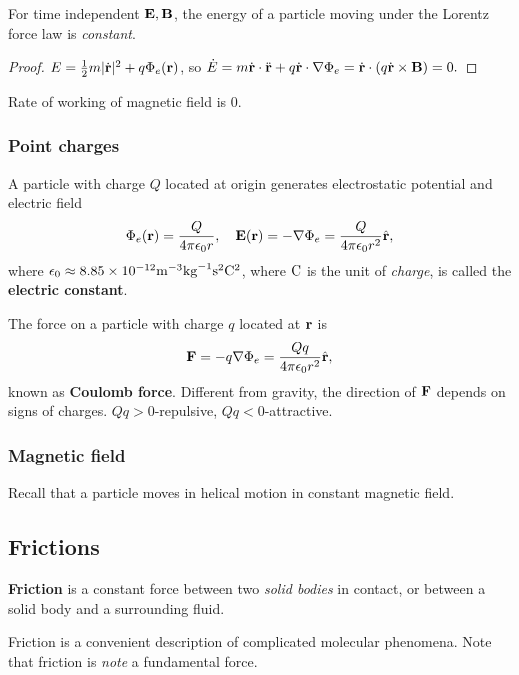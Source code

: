 \begin{proposition}
    For time independent $ {\bf E},{\bf B} $, the energy of a particle moving under the Lorentz force law is \textit{constant}.
\end{proposition}
\begin{proof}
    $ E = \frac{1}{2}m|\dot{{\bf r}}|^2+q\Phi_e({\bf r}) $, so $ \dot{E}=m \dot{{\bf r}} \cdot \ddot{{\bf r}}+q \dot{{\bf r}}\cdot \nabla \Phi_e = \dot{{\bf r}}\cdot (q \dot{{\bf r}}\times {\bf B}) =0. $
\end{proof}
\begin{note}
    Rate of working of magnetic field is 0.
\end{note}

\subsubsection*{Point charges}
A particle with charge $Q$ located at origin generates electrostatic potential and electric field
\[
    \Phi_e({\bf r}) = \frac{Q}{4\pi \epsilon_0 r},\quad {\bf E}({\bf r}) = -\nabla \Phi_e = \frac{Q}{4\pi \epsilon_0 r^2} \hat{{\bf r}},
\]
where $ \epsilon_0 \approx 8.85 \times 10^{-12}\mathrm{m}^{-3}\mathrm{kg}^{-1}\mathrm{s}^2\mathrm{C}^2 $, where $ \mathrm{C} $ is the unit of \textit{charge}, is called the \textbf{electric constant}.

The force on a particle with charge $q$ located at ${\bf r}$ is 
\[
    \mathbf{F} = -q \nabla \Phi_e = \frac{Qq}{4\pi \epsilon_0 r^2}\hat{{\bf r}},
\]
known as \textbf{Coulomb force}. Different from gravity, the direction of ${\bf F}$ depends on signs of charges. $ Qq>0 $-repulsive, $ Qq<0 $-attractive.

\subsubsection*{Magnetic field}
Recall that a particle moves in helical motion in constant magnetic field.

\subsection{Frictions}
\begin{definition}
    \textbf{Friction} is a constant force between two \textit{solid bodies} in contact, or between a solid body and a surrounding fluid.
\end{definition}
\begin{note}
    Friction is a convenient description of complicated molecular phenomena. Note that friction is \textit{note} a fundamental force.
\end{note}

